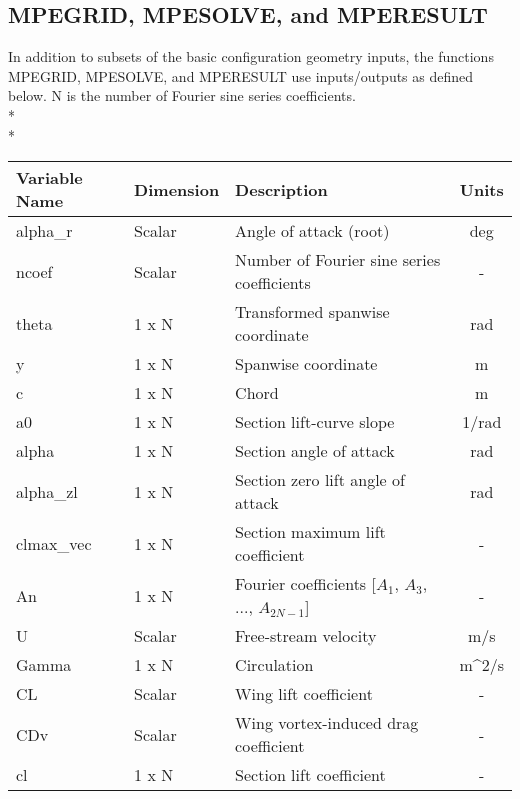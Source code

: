 \documentclass{article}
\begin{document}
\subsection{MPEGRID, MPESOLVE, and MPERESULT}
In addition to subsets of the basic configuration geometry inputs, the
functions MPEGRID, MPESOLVE, and MPERESULT use inputs/outputs as
defined below.  N is the number of Fourier sine series
coefficients.\\*\\*
\begin{tabular}{|l|l|p{3.5in}|c|}
  \hline
  \textbf{Variable Name} &
  \textbf{Dimension} &
  \textbf{Description} &
  \textbf{Units}
  \\
  \hline
  alpha\_r & Scalar &
  Angle of attack (root) &
  deg
  \\
  \hline
  ncoef & Scalar &
  Number of Fourier sine series coefficients &
  -
  \\
  \hline
  theta & 1 x N &
  Transformed spanwise coordinate &
  rad
  \\
  \hline
  y & 1 x N &
  Spanwise coordinate &
  m
  \\
  \hline
  c & 1 x N &
  Chord &
  m
  \\
  \hline
  a0 & 1 x N &
  Section lift-curve slope &
  1/rad
  \\
  \hline
  alpha & 1 x N &
  Section angle of attack &
  rad
  \\
  \hline
  alpha\_zl & 1 x N &
  Section zero lift angle of attack &
  rad
  \\
  \hline
  clmax\_vec & 1 x N &
  Section maximum lift coefficient &
  -
  \\
  \hline
  An & 1 x N &
  Fourier coefficients [$A_1$, $A_3$, ..., $A_{2N-1}$] &
  -
  \\
  \hline
  U & Scalar &
  Free-stream velocity &
  m/s
  \\
  \hline
  Gamma & 1 x N &
  Circulation &
  m\^{}2/s
  \\
  \hline
  CL & Scalar &
  Wing lift coefficient &
  -
  \\
  \hline
  CDv & Scalar &
  Wing vortex-induced drag coefficient &
  -
  \\
  \hline
  cl & 1 x N &
  Section lift coefficient &
  -
  \\
  \hline
\end{tabular}
\end{document}
